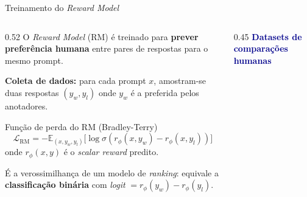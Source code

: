 \documentclass[aspectratio=169, xcolor=dvipsnames]{beamer}
\begin{document}
  \begin{frame}{Treinamento do \textit{Reward Model}}
    \begin{columns}
      \begin{column}{0.52\textwidth}
        O \textit{Reward Model} (RM) é treinado para \textbf{prever preferência humana}
        entre pares de respostas para o mesmo prompt.

        \vspace{0.2em}
        \textbf{Coleta de dados:} para cada prompt $x$, amostram-se duas respostas
        $(y_w, y_l)$ onde $y_w$ é a preferida pelos anotadores.

        \vspace{0.2em}
        \begin{block}{Função de perda do RM (Bradley-Terry)}
          \small
          \[
            \mathcal{L}_{\text{RM}} = -\mathbb{E}_{(x,y_w,y_l)}\big[
              \log \sigma\!\left(r_\phi(x,y_w) - r_\phi(x,y_l)\right)
            \big]
          \]
          onde $r_\phi(x,y)$ é o \textit{scalar reward} predito.
        \end{block}

        {\small É a verossimilhança de um modelo de \textit{ranking}: equivale a \textbf{classificação binária} com \textit{logit} $= r_\phi(y_w){-}r_\phi(y_l)$.}
      \end{column}
      \begin{column}{0.45\textwidth}
        \textcolor{DarkBlue}{\textbf{Datasets de comparações humanas}}
        \vspace{0.1em}



\end{column}
\end{columns}
\end{frame}
\end{document}

